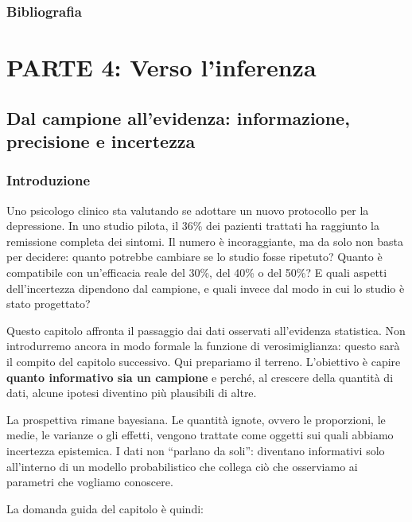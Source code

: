 \documentclass[
  italian,
  letterpaper,
  a4paper,
  11pt,
  open=any]{scrbook}
\theoremstyle{plain}
\theoremstyle{definition}
\theoremstyle{definition}
\theoremstyle{remark}
\begin{document}
\section*{Bibliografia}\label{bibliografia-6}


\part{PARTE 4: Verso l'inferenza}

\chapter{Dal campione all'evidenza: informazione, precisione e
incertezza}\label{sec-prob-inference-uncertainty}

\section*{Introduzione}\label{introduzione-12}


Uno psicologo clinico sta valutando se adottare un nuovo protocollo per
la depressione. In uno studio pilota, il 36\% dei pazienti trattati ha
raggiunto la remissione completa dei sintomi. Il numero è incoraggiante,
ma da solo non basta per decidere: quanto potrebbe cambiare se lo studio
fosse ripetuto? Quanto è compatibile con un'efficacia reale del 30\%,
del 40\% o del 50\%? E quali aspetti dell'incertezza dipendono dal
campione, e quali invece dal modo in cui lo studio è stato progettato?

Questo capitolo affronta il passaggio dai dati osservati all'evidenza
statistica. Non introdurremo ancora in modo formale la funzione di
verosimiglianza: questo sarà il compito del capitolo successivo. Qui
prepariamo il terreno. L'obiettivo è capire \textbf{quanto informativo
sia un campione} e perché, al crescere della quantità di dati, alcune
ipotesi diventino più plausibili di altre.

La prospettiva rimane bayesiana. Le quantità ignote, ovvero le
proporzioni, le medie, le varianze o gli effetti, vengono trattate come
oggetti sui quali abbiamo incertezza epistemica. I dati non ``parlano da
soli'': diventano informativi solo all'interno di un modello
probabilistico che collega ciò che osserviamo ai parametri che vogliamo
conoscere.

La domanda guida del capitolo è quindi:
\end{document}
